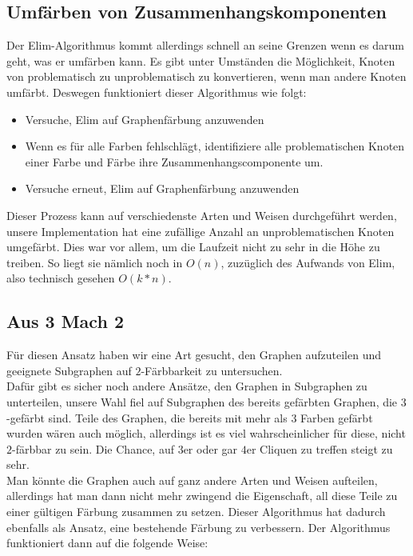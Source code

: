 \documentclass[11pt]{article}
\begin{document}
\subsection{Umfärben von Zusammenhangskomponenten}

Der Elim-Algorithmus kommt allerdings schnell an seine Grenzen wenn es darum geht, was er umfärben kann. Es gibt unter Umständen die Möglichkeit,
Knoten von problematisch zu unproblematisch zu konvertieren, wenn man andere Knoten umfärbt. Deswegen funktioniert dieser Algorithmus wie folgt: \\

\begin{itemize}
  \item Versuche, Elim auf Graphenfärbung anzuwenden
  \item Wenn es für alle Farben fehlschlägt, identifiziere alle problematischen Knoten einer Farbe und Färbe ihre Zusammenhangscomponente um.
  \item Versuche erneut, Elim auf Graphenfärbung anzuwenden
\end{itemize}

Dieser Prozess kann auf verschiedenste Arten und Weisen durchgeführt werden, unsere Implementation hat eine zufällige Anzahl an unproblematischen Knoten umgefärbt.
Dies war vor allem, um die Laufzeit nicht zu sehr in die Höhe zu treiben. So liegt sie nämlich noch in $O(n)$, zuzüglich des Aufwands von Elim, also technisch gesehen $O(k*n)$.

\subsection{Aus 3 Mach 2}

Für diesen Ansatz haben wir eine Art gesucht, den Graphen aufzuteilen und geeignete Subgraphen auf $2$-Färbbarkeit zu untersuchen. \\
Dafür gibt es sicher noch andere Ansätze, den Graphen in Subgraphen zu unterteilen, unsere Wahl fiel auf Subgraphen des bereits gefärbten Graphen, die $3$-gefärbt sind.
Teile des Graphen, die bereits mit mehr als $3$ Farben gefärbt wurden wären auch möglich, allerdings ist es viel wahrscheinlicher für diese, nicht $2$-färbbar zu sein.
Die Chance, auf $3$er oder gar $4$er Cliquen zu treffen steigt zu sehr. \\
Man könnte die Graphen auch auf ganz andere Arten und Weisen aufteilen, allerdings hat man dann nicht mehr zwingend die Eigenschaft, all diese Teile zu einer gültigen Färbung zusammen zu setzen.
Dieser Algorithmus hat dadurch ebenfalls als Ansatz, eine bestehende Färbung zu verbessern. Der Algorithmus funktioniert dann auf die folgende Weise: \\
\end{document}
